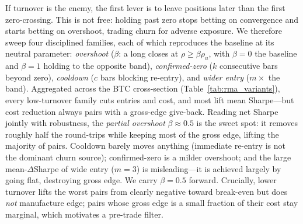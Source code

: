 \documentclass[10pt,twocolumn,a4paper]{article}
\begin{document}
If turnover is the enemy, the first lever is to leave positions later than the first zero-crossing. This is not free: holding past zero stops betting on convergence and starts betting on overshoot, trading churn for adverse exposure. We therefore sweep four disciplined families, each of which reproduces the baseline at its neutral parameter: \emph{overshoot} ($\beta$: a long closes at $\rho\ge\beta\rho_u$, with $\beta{=}0$ the baseline and $\beta{=}1$ holding to the opposite band), \emph{confirmed-zero} ($k$ consecutive bars beyond zero), \emph{cooldown} ($c$ bars blocking re-entry), and \emph{wider entry} ($m\times$ the band). Aggregated across the BTC cross-section (Table~\ref{tab:rma_variants}), every low-turnover family cuts entries and cost, and most lift mean Sharpe---but cost reduction always pairs with a gross-edge give-back. Reading net Sharpe jointly with robustness, the \emph{partial overshoot} $\beta\approx0.5$ is the sweet spot: it removes roughly half the round-trips while keeping most of the gross edge, lifting the majority of pairs. Cooldown barely moves anything (immediate re-entry is not the dominant churn source); confirmed-zero is a milder overshoot; and the large mean-$\Delta$Sharpe of wide entry ($m{=}3$) is misleading---it is achieved largely by going flat, destroying gross edge. We carry $\beta=0.5$ forward. Crucially, lower turnover lifts the worst pairs from clearly negative toward break-even but does \emph{not} manufacture edge; pairs whose gross edge is a small fraction of their cost stay marginal, which motivates a pre-trade filter.
\end{document}
